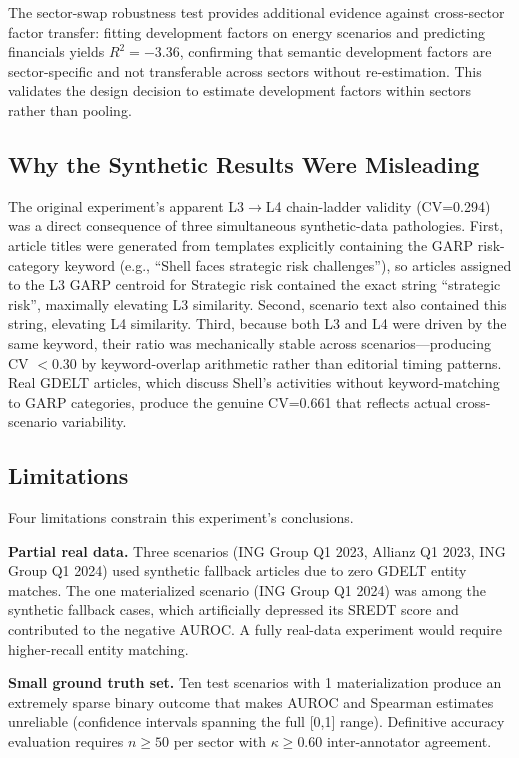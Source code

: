 \documentclass[11pt,letterpaper]{article}
\begin{document}
The sector-swap robustness test provides additional evidence against cross-sector factor transfer: fitting development factors on energy scenarios and predicting financials yields $R^2=-3.36$, confirming that semantic development factors are sector-specific and not transferable across sectors without re-estimation. This validates the design decision to estimate development factors within sectors rather than pooling.

\subsection{Why the Synthetic Results Were Misleading}

The original experiment's apparent L3$\to$L4 chain-ladder validity (CV=0.294) was a direct consequence of three simultaneous synthetic-data pathologies. First, article titles were generated from templates explicitly containing the GARP risk-category keyword (e.g., ``Shell faces strategic risk challenges''), so articles assigned to the L3 GARP centroid for Strategic risk contained the exact string ``strategic risk'', maximally elevating L3 similarity. Second, scenario text also contained this string, elevating L4 similarity. Third, because both L3 and L4 were driven by the same keyword, their ratio was mechanically stable across scenarios---producing CV $< 0.30$ by keyword-overlap arithmetic rather than editorial timing patterns. Real GDELT articles, which discuss Shell's activities without keyword-matching to GARP categories, produce the genuine CV=0.661 that reflects actual cross-scenario variability.

\subsection{Limitations}

Four limitations constrain this experiment's conclusions.

\textbf{Partial real data.} Three scenarios (ING Group Q1 2023, Allianz Q1 2023, ING Group Q1 2024) used synthetic fallback articles due to zero GDELT entity matches. The one materialized scenario (ING Group Q1 2024) was among the synthetic fallback cases, which artificially depressed its SREDT score and contributed to the negative AUROC. A fully real-data experiment would require higher-recall entity matching.

\textbf{Small ground truth set.} Ten test scenarios with 1 materialization produce an extremely sparse binary outcome that makes AUROC and Spearman estimates unreliable (confidence intervals spanning the full [0,1] range). Definitive accuracy evaluation requires $n \geq 50$ per sector with $\kappa \geq 0.60$ inter-annotator agreement.
\end{document}
